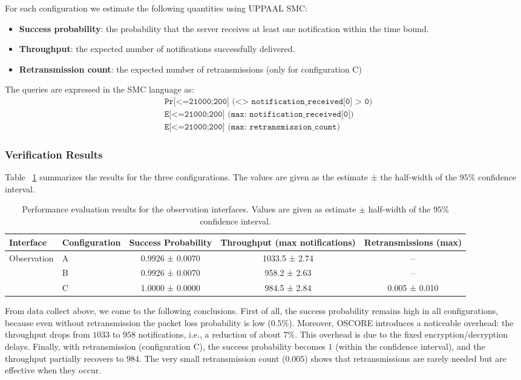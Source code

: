 \documentclass[a4paper,fleqn]{cas-sc}
\begin{document}
For each configuration we estimate the following quantities using UPPAAL SMC:
\begin{itemize}
    \item \textbf{Success probability}: the probability that the server receives at least one notification within the time bound.
    \item \textbf{Throughput}: the expected number of notifications successfully delivered.
    \item \textbf{Retransmission count}: the expected number of retransmissions (only for configuration C)
\end{itemize}

The queries are expressed in the SMC language as:
\[
\begin{aligned}
&\texttt{Pr[<=21000;200] (<> notification\_received[0] > 0)}\\
&\texttt{E[<=21000;200] (max: notification\_received[0])}\\
&\texttt{E[<=21000;200] (max: retransmission\_count)}
\end{aligned}
\]

\subsubsection{Verification Results}
Table ~\ref{tab:obs-perf-results} summarizes the results for the three configurations. The values are given as the estimate ± the half‑width of the $95\%$ confidence interval.
\begin{table}[htbp]
\centering
\caption{Performance evaluation results for the observation interfaces. Values are given as estimate $\pm$ half‑width of the $95\%$ confidence interval.}
\label{tab:obs-perf-results}
\begin{tabular}{llccc}
\toprule
\textbf{Interface} & \textbf{Configuration} & \textbf{Success Probability} & \textbf{Throughput (max notifications)} & \textbf{Retransmissions (max)} \\
\midrule
\multirow{3}{*}{Observation}
 & A & 0.9926 ± 0.0070 & 1033.5 ± 2.74 & – \\
 & B & 0.9926 ± 0.0070 & 958.2 ± 2.63  & – \\
 & C & 1.0000 ± 0.0000 & 984.5 ± 2.84  & 0.005 ± 0.010 \\
\bottomrule
\end{tabular}
\end{table}

From data collect above, we come to the following conclusions. First of all, the success probability remains high in all configurations, because even without retransmission the packet loss probability is low ($0.5\%$). Moreover, OSCORE introduces a noticeable overhead: the throughput drops from $1033$ to $958$ notifications, i.e., a reduction of about $7\%$. This overhead is due to the fixed encryption/decryption delays. Finally, with retransmission (configuration C), the success probability becomes $1$ (within the confidence interval), and the throughput partially recovers to $984$. The very small retransmission count ($0.005$) shows that retransmissions are rarely needed but are effective when they occur.
\end{document}
